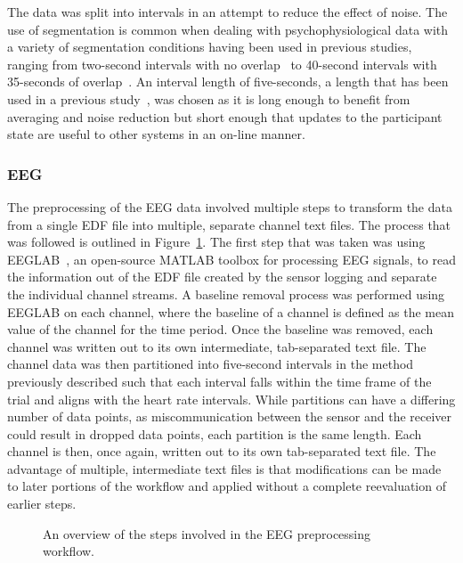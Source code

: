 \documentclass[11pt]{article}
\begin{document}
	The data was split into intervals in an attempt to reduce the effect of noise. The use of segmentation is common when dealing with psychophysiological data with a variety of segmentation conditions having been used in previous studies, ranging from two-second intervals with no overlap~\cite{Smith} to 40-second intervals with 35-seconds of overlap~\cite{Wang_Z}. An interval length of five-seconds, a length that has been used in a previous study~\cite{Yin}, was chosen as it is long enough to benefit from averaging and noise reduction but short enough that updates to the participant state are useful to other systems in an on-line manner. 
	
		\subsubsection{EEG}
		The preprocessing of the EEG data involved multiple steps to transform the data from a single EDF file into multiple, separate channel text files. The process that was followed is outlined in Figure~\ref{fig:eeg-preprocessing}. The first step that was taken was using EEGLAB~\cite{EEGLAB}, an open-source MATLAB toolbox for processing EEG signals, to read the information out of the EDF file created by the sensor logging and separate the individual channel streams. A baseline removal process was performed using EEGLAB on each channel, where the baseline of a channel is defined as the mean value of the channel for the time period. Once the baseline was removed, each channel was written out to its own intermediate, tab-separated text file. The channel data was then partitioned into five-second intervals in the method previously described such that each interval falls within the time frame of the trial and aligns with the heart rate intervals. While partitions can have a differing number of data points, as miscommunication between the sensor and the receiver could result in dropped data points, each partition is the same length. Each channel is then, once again, written out to its own tab-separated text file. The advantage of multiple, intermediate text files is that modifications can be made to later portions of the workflow and applied without a complete reevaluation of earlier steps.
		\begin{figure}
		\centering
		\caption[Overview of EEG Preprocessing Workflow]{An overview of the steps involved in the EEG preprocessing workflow.}
		\label{fig:eeg-preprocessing}
		\end{figure} 
			
\end{document}
